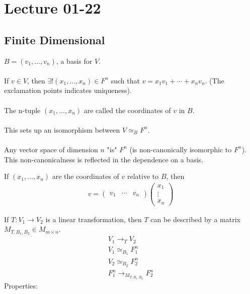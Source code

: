 \documentclass[class=scrartcl, crop=false]{standalone}
\date{2020-01-22}
\begin{document}
\section{Lecture 01-22}

\subsection{Finite Dimensional}

$B = (v_1, \dots, v_n)$, a basis for $V$.
\\\\
If $v \in V$, then $\exists ! (x_1, \dots, x_n) \in F^n$ such that $v = x_1 v_1 + \cdots + x_n v_n$. (The exclamation points indicates uniqueness).
\\\\
The n-tuple  $(x_1, \dots, x_n)$ are called the coordinates of $v$ in $B$.
\\\\
This sets up an isomorphism between $V \simeq_B F^n$.
\\\\
Any vector space of dimension $n$ "is" $F^n$ (is non-canonically isomorphic to $F^n$). This non-canonicalness is reflected in the dependence on a basis.
\begin{note}
  If $(x_1, \dots, x_n)$ are the coordinates of $v$ relative to $B$, then 
  \begin{gather*}
    v = 
    \begin{pmatrix}
      v_1 & \cdots & v_n
    \end{pmatrix} 
    \begin{pmatrix}
      x_1 \\
      \vdots \\
      x_n
    \end{pmatrix} 
  \end{gather*} 
\end{note} 
If $T: V_1 \to V_2$ is a linear transformation, then $T$ can be described by a matrix $M_{T, B_1, B_2} \in M_{m \times n}$.
\begin{gather*}
  V_1 \to_T V_2 \\
  V_1 \simeq_{B_1} F^n_1 \\
  V_2 \simeq_{B_2} F^n_2 \\
  F^n_1 \to_{M_{T, B_1, B_2}} F^n_2
\end{gather*} 
Properties:
\end{document}
